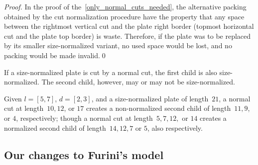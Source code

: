 \documentclass[runningheads]{llncs}
\begin{document}
\begin{proof}
In the proof of the~\autoref{only_normal_cuts_needed}, the alternative packing obtained by the cut normalization procedure have the property that any space between the rightmost vertical cut and the plate right border (topmost horizontal cut and the plate top border) is waste. Therefore, if the plate was to be replaced by its smaller size-normalized variant, no used space would be lost, and no packing would be made invalid.\qed
\end{proof}

\begin{remark}
If a size-normalized plate is cut by a normal cut, the first child is also size-normalized. The second child, however, may or may not be size-normalized.
\end{remark}


\begin{example}
Given \(l = [5, 7]\), \(d = [2, 3]\), and a size-normalized plate of length~\(21\), a normal cut at length~\(10, 12\), or \(17\) creates a non-normalized second child of length~\(11, 9\), or \(4\), respectively; though a normal cut at length~\(5, 7, 12,\) or \(14\) creates a normalized second child of length~\(14, 12, 7\) or \(5\), also respectively.
\end{example}

\subsection{Our changes to Furini's model}

% 

\end{document}
